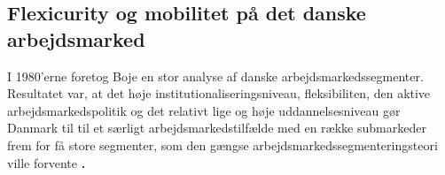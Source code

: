 


\subsection{Flexicurity og mobilitet på det danske arbejdsmarked}

I 1980'erne foretog Boje en stor analyse af danske arbejdsmarkedssegmenter. Resultatet var, at det høje institutionaliseringsniveau, fleksibiliten, den aktive arbejdsmarkedspolitik og det relativt lige og høje uddannelsesniveau gør Danmark til til et særligt arbejdsmarkedstilfælde med en række submarkeder frem for få store segmenter, som den gængse arbejdsmarkedssegmenteringsteori ville forvente \textbf{\parencite{Boje1986}.} %



